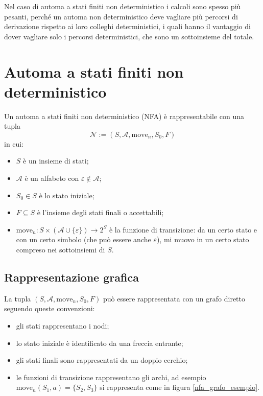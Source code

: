 \documentclass[class=book, crop=false, oneside, 12pt]{standalone}
\begin{document}
Nel caso di automa a stati finiti non deterministico i calcoli sono spesso più pesanti, perché un automa non deterministico deve vagliare più percorsi di derivazione rispetto ai loro colleghi deterministici, i quali hanno il vantaggio di dover vagliare solo i percorsi deterministici, che sono un sottoinsieme del totale.

\section{Automa a stati finiti non deterministico}
Un automa a stati finiti non deterministico (NFA) è rappresentabile con una tupla
\begin{equation}
    \mathcal{N} := (S, \mathcal{A}, \textrm{move}_n, S_0, F)
    \label{nfa_tupla}
\end{equation}
in cui:
\begin{itemize}
    \item \(S\) è un insieme di stati;
    \item \(\mathcal{A}\) è un alfabeto con \(\varepsilon \notin \mathcal{A}\);
    \item \(S_0 \in S\) è lo stato iniziale;
    \item \(F \subseteq S\) è l’insieme degli stati finali o accettabili;
    \item \(\textrm{move}_n : S \times (\mathcal{A} \cup \{\varepsilon\}) \to 2^S\) è la funzione di transizione: da un certo stato e con un certo simbolo (che può essere anche \(\varepsilon\)), mi muovo in un certo stato compreso nei sottoinsiemi di \(S\).
\end{itemize}

\subsection{Rappresentazione grafica}
La tupla \((S, \mathcal{A}, \textrm{move}_n, S_0, F)\) può essere rappresentata con un grafo diretto seguendo queste convenzioni:
\begin{itemize}
    \item gli stati rappresentano i nodi;
    \item lo stato iniziale è identificato da una freccia entrante;
    \item gli stati finali sono rappresentati da un doppio cerchio;
    \item le funzioni di transizione rappresentano gli archi, ad esempio \(\textrm{move}_n(S_1, a) = \{S_2, S_3\}\) si rappresenta come in figura \ref{nfa_grafo_esempio}.
\end{itemize}
\end{document}
